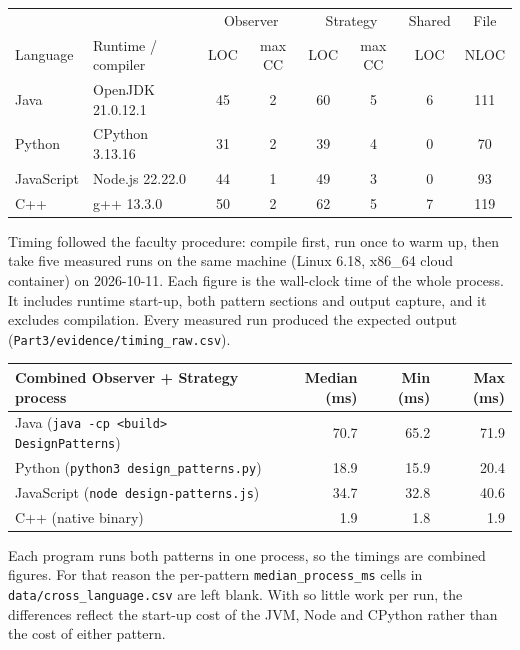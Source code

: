 \documentclass[11pt,a4paper]{article}
\newcommand{\code}[1]{\nolinkurl{#1}}
\begin{document}
\begin{tabularx}{\linewidth}{@{}lXcccccc@{}}\toprule
 & & \multicolumn{2}{c}{Observer} & \multicolumn{2}{c}{Strategy} & Shared & File\\
Language & Runtime / compiler & LOC & max CC & LOC & max CC & LOC & NLOC\\\midrule
Java & OpenJDK 21.0.12.1 & 45 & 2 & 60 & 5 & 6 & 111\\
Python & CPython 3.13.16 & 31 & 2 & 39 & 4 & 0 & 70\\
JavaScript & Node.js 22.22.0 & 44 & 1 & 49 & 3 & 0 & 93\\
C++ & g++ 13.3.0 & 50 & 2 & 62 & 5 & 7 & 119\\\bottomrule
\end{tabularx}

Timing followed the faculty procedure: compile first, run once to warm up, then take five measured runs on the same machine (Linux 6.18, x86\_64 cloud container) on 2026-10-11. Each figure is the wall-clock time of the whole process. It includes runtime start-up, both pattern sections and output capture, and it excludes compilation. Every measured run produced the expected output (\code{Part3/evidence/timing_raw.csv}).

\begin{tabularx}{\linewidth}{@{}Xrrr@{}}\toprule
Combined Observer + Strategy process & Median (ms) & Min (ms) & Max (ms)\\\midrule
Java (\code{java -cp <build> DesignPatterns}) & 70.7 & 65.2 & 71.9\\
Python (\code{python3 design_patterns.py}) & 18.9 & 15.9 & 20.4\\
JavaScript (\code{node design-patterns.js}) & 34.7 & 32.8 & 40.6\\
C++ (native binary) & 1.9 & 1.8 & 1.9\\\bottomrule
\end{tabularx}

Each program runs both patterns in one process, so the timings are combined figures. For that reason the per-pattern \code{median_process_ms} cells in \code{data/cross_language.csv} are left blank. With so little work per run, the differences reflect the start-up cost of the JVM, Node and CPython rather than the cost of either pattern.
\end{document}
